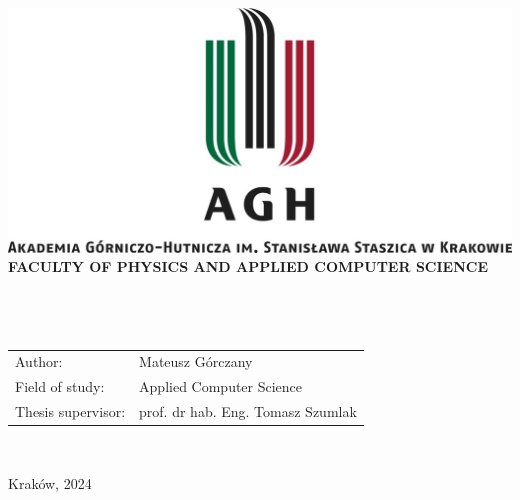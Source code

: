 \documentclass[11pt,a4paper]{report}
\begin{document}
\thispagestyle{empty}
\begin{center}
\includegraphics[width=\textwidth]{logo_AGH.jpg}\\
{\bf{\sf FACULTY OF PHYSICS AND APPLIED COMPUTER SCIENCE}}\\[5mm]
{\bf{}}\\[14mm]
{}\\[12mm] 
{}\\[40mm]
\end{center}
{\sf
\begin{tabular}{ll}
Author: & Mateusz Górczany\\
Field of study: &	Applied Computer Science\\

Thesis supervisor: & prof. dr hab. Eng. Tomasz Szumlak\\
\end{tabular}
}\\[10mm]
\begin{center}
{\sf Kraków, 2024}
\end{center}

\newpage
\end{document}
